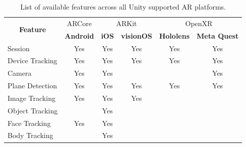 \documentclass{l4proj}
\begin{document}
\begin{table}[hbt!]
\caption{List of available features across all Unity supported AR platforms. \citep{noauthor_ar_nodate}}
\label{tab:arfFeatures}
\centering
{}
\begin{tabular}{|l|c|cc|cc|}
\hline
\multicolumn{1}{|c|}{\multirow{2}{*}{\textbf{Feature}}} & ARCore           & \multicolumn{2}{c|}{ARKit}                            & \multicolumn{2}{c|}{OpenXR}                                  \\ \cline{2-6} 
\multicolumn{1}{|c|}{}                                  & \textbf{Android} & \multicolumn{1}{c|}{\textbf{iOS}} & \textbf{visionOS} & \multicolumn{1}{c|}{\textbf{Hololens}} & \textbf{Meta Quest} \\ \hline
Session                                                 & Yes              & \multicolumn{1}{c|}{Yes}          & Yes               & \multicolumn{1}{c|}{Yes}               & Yes                 \\
Device Tracking                                         & Yes              & \multicolumn{1}{c|}{Yes}          & Yes               & \multicolumn{1}{c|}{Yes}               & Yes                 \\
Camera                                                  & Yes              & \multicolumn{1}{c|}{Yes}          &                   & \multicolumn{1}{c|}{}                  & Yes                 \\
Plane Detection                                         & Yes              & \multicolumn{1}{c|}{Yes}          & Yes               & \multicolumn{1}{c|}{Yes}               & Yes                 \\
Image Tracking                                          & Yes              & \multicolumn{1}{c|}{Yes}          & Yes               & \multicolumn{1}{c|}{}                  &                     \\
Object Tracking                                         &                  & \multicolumn{1}{c|}{Yes}          &                   & \multicolumn{1}{c|}{}                  &                     \\
Face Tracking                                           & Yes              & \multicolumn{1}{c|}{Yes}          &                   & \multicolumn{1}{c|}{}                  &                     \\
Body Tracking                                           &                  & \multicolumn{1}{c|}{Yes}          &                   & \multicolumn{1}{c|}{}                  &                     \\

\end{tabular}
\end{table}
\end{document}
